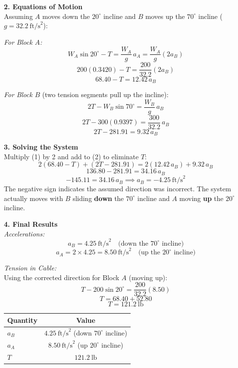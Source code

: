 \documentclass[12pt,a3paper]{article}
\begin{document}
\begin{enumerate}
\begin{tcolorbox}[enhanced,breakable,ansbox,colback=cG!4,colframe=cG,
  boxrule=0.8pt,arc=5pt,
  title={\textbf{Solution}},fonttitle=\bfseries\color{white},
  colbacktitle=cG]
\medskip
\textbf{2. Equations of Motion}\\[4pt]
Assuming $A$ moves down the $20^\circ$ incline and $B$ moves up
the $70^\circ$ incline ($g = 32.2\ \text{ft/s}^2$):

\textit{For Block $A$:}
\[
  W_A\sin20^\circ - T = \frac{W_A}{g}\,a_A = \frac{W_A}{g}(2a_B)
\]
\[
  200(0.3420) - T = \frac{200}{32.2}(2a_B)
\]
\[
  68.40 - T = 12.42\,a_B \tag{1}
\]

\textit{For Block $B$} (two tension segments pull up the incline):
\[
  2T - W_B\sin70^\circ = \frac{W_B}{g}\,a_B
\]
\[
  2T - 300(0.9397) = \frac{300}{32.2}\,a_B
\]
\[
  2T - 281.91 = 9.32\,a_B \tag{2}
\]

\medskip
\textbf{3. Solving the System}\\[4pt]
Multiply (1) by 2 and add to (2) to eliminate $T$:
\[
  2(68.40 - T) + (2T - 281.91) = 2(12.42\,a_B) + 9.32\,a_B
\]
\[
  136.80 - 281.91 = 34.16\,a_B
\]
\[
  -145.11 = 34.16\,a_B
  \implies a_B = -4.25\ \text{ft/s}^2
\]
The negative sign indicates the assumed direction was incorrect.
The system actually moves with $B$ sliding \textbf{down} the $70^\circ$
incline and $A$ moving \textbf{up} the $20^\circ$ incline.

\medskip
\textbf{4. Final Results}\\[4pt]

\textit{Accelerations:}
\[
  \boxed{a_B = 4.25\ \text{ft/s}^2 \quad \text{(down the } 70^\circ \text{ incline)}}
\]
\[
  \boxed{a_A = 2 \times 4.25 = 8.50\ \text{ft/s}^2 \quad \text{(up the } 20^\circ \text{ incline)}}
\]

\textit{Tension in Cable:}\\
Using the corrected direction for Block $A$ (moving up):
\[
  T - 200\sin20^\circ = \frac{200}{32.2}(8.50)
\]
\[
  T = 68.40 + 52.80
\]
\[
  \boxed{T = 121.2\ \text{lb}}
\]

\medskip
\begin{center}
\renewcommand{\arraystretch}{1.4}
\begin{tabular}{lc}
  \hline
  \textbf{Quantity} & \textbf{Value} \\
  \hline
  $a_B$ & $4.25\ \text{ft/s}^2$ (down $70^\circ$ incline) \\
  $a_A$ & $8.50\ \text{ft/s}^2$ (up $20^\circ$ incline)   \\
  $T$   & $121.2\ \text{lb}$ \\
  \hline
\end{tabular}
\end{center}


\end{tcolorbox}
\end{enumerate}
\end{document}
